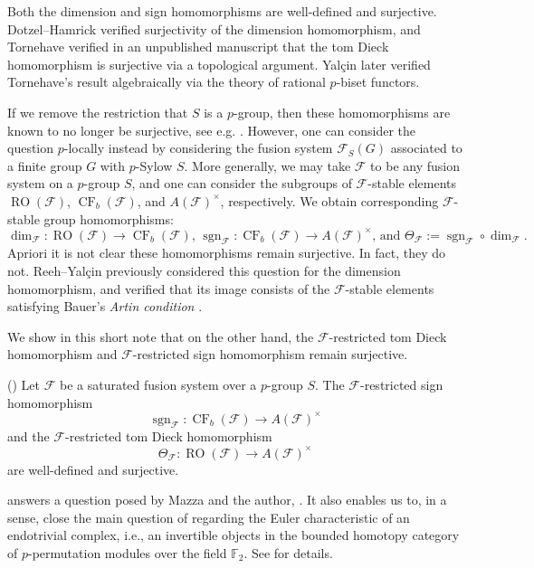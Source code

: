 \documentclass[]{amsart}
\newcommand{\on}[1]{\operatorname{#1}}
\newcommand{\calF}{\mathcal{F}}
\newcommand{\bbF}{\mathbb{F}}
\newcommand{\RO}{\on{RO}}
\newcommand{\CF}{\on{CF}}
\newcommand{\sgn}{\on{sgn}}
\theoremstyle{remark}
\theoremstyle{definition}
\newenvironment{customthm}[1]
{\renewcommand\theinnercustomthm{#1}\innercustomthm}
{\endinnercustomthm}
\begin{document}
	Both the dimension and sign homomorphisms are well-defined and surjective.  Dotzel--Hamrick \cite{DH81} verified surjectivity of the dimension homomorphism, and Tornehave \cite{Tor84} verified in an unpublished manuscript that the tom Dieck homomorphism is surjective via a topological argument. Yal\c{c}in \cite{Y05} later verified Tornehave's result algebraically via the theory of rational $p$-biset functors.  
	
	If we remove the restriction that $S$ is a $p$-group, then these homomorphisms are known to no longer be surjective, see e.g. \cite[Remark 5.3]{Bar11}. However, one can consider the question $p$-locally instead by considering the fusion system $\calF_S(G)$ associated to a finite group $G$ with $p$-Sylow $S$. More generally, we may take $\calF$ to be any fusion system on a $p$-group $S$, and one can consider the subgroups of $\calF$-stable elements $\on{RO}(\calF)$, $\on{CF}_b(\calF)$, and $A(\calF)^\times$, respectively. We obtain corresponding $\calF$-stable group homomorphisms:
	\[\dim_\calF\colon \on{RO}(\calF) \to \on{CF}_b(\calF) \text{,  } \sgn_\calF\colon \on{CF}_b(\calF) \to A(\calF)^\times \text{,  and  } \Theta_\calF := \sgn_\calF\circ \dim_\calF.\]
	Apriori it is not clear these homomorphisms remain surjective. In fact, they do not. Reeh--Yal\c{c}in previously considered this question for the dimension homomorphism, and verified that its image consists of the $\calF$-stable elements satisfying Bauer's \emph{Artin condition} \cite{RY18}. 
	
	We show in this short note that on the other hand, the $\calF$-restricted tom Dieck homomorphism and $\calF$-restricted sign homomorphism remain surjective. 
	
	\begin{customthm}{A}\label{thm:A}()
		Let $\calF$ be a saturated fusion system over a $p$-group $S$. The $\calF$-restricted sign homomorphism \[\sgn_\calF\colon \CF_b(\calF) \to A(\calF)^\times\] and the $\calF$-restricted tom Dieck homomorphism \[\Theta_\calF\colon \RO(\calF) \to A(\calF)^\times\] are well-defined and surjective.
	\end{customthm}
	
	 answers a question posed by Mazza and the author, \cite[Remark 4.2]{MM26}. It also enables us to, in a sense, close the main question of \cite{MM26} regarding the Euler characteristic of an endotrivial complex, i.e., an invertible objects in the bounded homotopy category of $p$-permutation modules over the field $\bbF_2$. See  for details.
	
\end{document}

